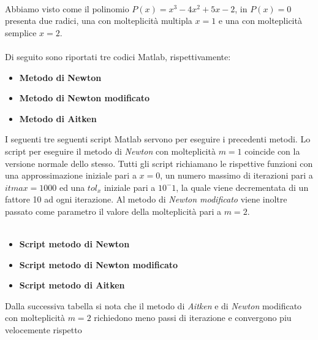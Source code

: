 \large\noindent{}\\
Abbiamo visto come il polinomio $P(x) = x^3-4x^2+5x-2$, in $P(x)=0$ presenta due radici, una con molteplicità multipla $x=1$ e una con molteplicità semplice $x=2$.\\\\
Di seguito sono riportati tre codici Matlab, rispettivamente:
\begin{itemize}
	\item \textbf{Metodo di Newton}
		
	\item \textbf{Metodo di Newton modificato}
		
	\item \textbf{Metodo di Aitken}
		
\end{itemize}
I seguenti tre seguenti script Matlab servono per eseguire i precedenti
metodi. Lo script per eseguire il metodo di \textit{Newton} con molteplicità 
$m=1$ coincide con la versione normale dello stesso.
Tutti gli script richiamano le rispettive funzioni con una
approssimazione iniziale pari a $x=0$, un numero massimo
di iterazioni pari a $itmax=1000$ ed una $tol_x$ iniziale pari a $10^-1$, la quale viene decrementata di un fattore 10 ad ogni iterazione. Al metodo di \textit{Newton modificato} viene inoltre passato come parametro il valore della molteplicità 
pari a $m=2$.\\\\
\begin{itemize}
	\item \textbf{Script metodo di Newton}
		
	\item \textbf{Script metodo di Newton modificato}
		
	\item \textbf{Script metodo di Aitken}
		
\end{itemize}
Dalla successiva tabella si nota che il metodo di \textit{Aitken} e di \textit{Newton} modificato
con molteplicità $m=2$ richiedono meno passi di iterazione e convergono piu velocemente rispetto
